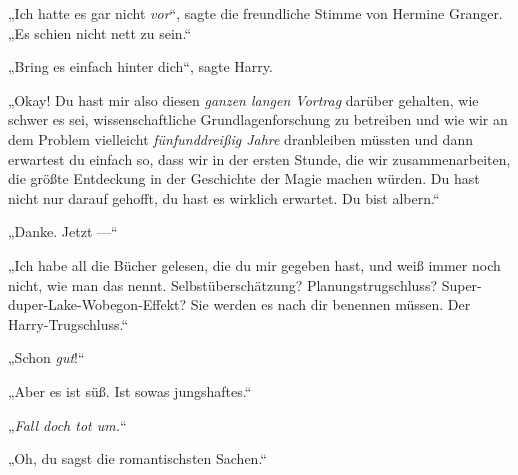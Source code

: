 „Ich hatte es gar nicht \emph{vor}“, sagte die freundliche Stimme von Hermine Granger.
„Es schien nicht nett zu sein.“

„Bring es einfach hinter dich“, sagte Harry.

„Okay! Du hast mir also diesen \emph{ganzen langen Vortrag} darüber gehalten, wie schwer es sei, wissenschaftliche Grundlagenforschung zu betreiben und wie wir an dem Problem vielleicht \emph{fünfunddreißig Jahre} dranbleiben müssten und dann erwartest du einfach so, dass wir in der ersten Stunde, die wir zusammenarbeiten, die größte Entdeckung in der Geschichte der Magie machen würden. Du hast nicht nur darauf gehofft, du hast es wirklich erwartet. Du bist albern.“

„Danke. Jetzt —“

„Ich habe all die Bücher gelesen, die du mir gegeben hast, und weiß immer noch nicht, wie man das nennt. Selbstüberschätzung? Planungstrugschluss? Super-duper-Lake-Wobegon-Effekt? Sie werden es nach dir benennen müssen. Der Harry-Trugschluss.“%

„Schon \emph{gut}!“

„Aber es ist süß. Ist sowas jungshaftes.“

„\emph{Fall doch tot um.}“

„Oh, du sagst die romantischsten Sachen.“

